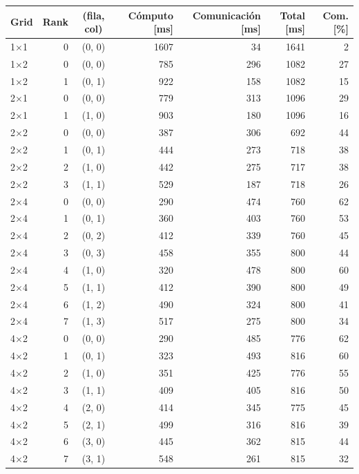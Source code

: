 \begin{tabular}{lrcrrrr}
\toprule
Grid & Rank & (fila, col) & Cómputo [ms] & Comunicación [ms] & Total [ms] & Com. [\%] \\
\midrule
1$\times$1 & 0 & (0, 0) & 1607 & 34 & 1641 & 2 \\
1$\times$2 & 0 & (0, 0) & 785 & 296 & 1082 & 27 \\
1$\times$2 & 1 & (0, 1) & 922 & 158 & 1082 & 15 \\
2$\times$1 & 0 & (0, 0) & 779 & 313 & 1096 & 29 \\
2$\times$1 & 1 & (1, 0) & 903 & 180 & 1096 & 16 \\
2$\times$2 & 0 & (0, 0) & 387 & 306 & 692 & 44 \\
2$\times$2 & 1 & (0, 1) & 444 & 273 & 718 & 38 \\
2$\times$2 & 2 & (1, 0) & 442 & 275 & 717 & 38 \\
2$\times$2 & 3 & (1, 1) & 529 & 187 & 718 & 26 \\
2$\times$4 & 0 & (0, 0) & 290 & 474 & 760 & 62 \\
2$\times$4 & 1 & (0, 1) & 360 & 403 & 760 & 53 \\
2$\times$4 & 2 & (0, 2) & 412 & 339 & 760 & 45 \\
2$\times$4 & 3 & (0, 3) & 458 & 355 & 800 & 44 \\
2$\times$4 & 4 & (1, 0) & 320 & 478 & 800 & 60 \\
2$\times$4 & 5 & (1, 1) & 412 & 390 & 800 & 49 \\
2$\times$4 & 6 & (1, 2) & 490 & 324 & 800 & 41 \\
2$\times$4 & 7 & (1, 3) & 517 & 275 & 800 & 34 \\
4$\times$2 & 0 & (0, 0) & 290 & 485 & 776 & 62 \\
4$\times$2 & 1 & (0, 1) & 323 & 493 & 816 & 60 \\
4$\times$2 & 2 & (1, 0) & 351 & 425 & 776 & 55 \\
4$\times$2 & 3 & (1, 1) & 409 & 405 & 816 & 50 \\
4$\times$2 & 4 & (2, 0) & 414 & 345 & 775 & 45 \\
4$\times$2 & 5 & (2, 1) & 499 & 316 & 816 & 39 \\
4$\times$2 & 6 & (3, 0) & 445 & 362 & 815 & 44 \\
4$\times$2 & 7 & (3, 1) & 548 & 261 & 815 & 32 \\
\bottomrule
\end{tabular}
